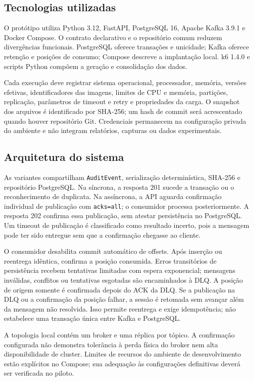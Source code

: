 \subsection{Tecnologias utilizadas}
O protótipo utiliza Python 3.12, FastAPI, PostgreSQL 16, Apache Kafka 3.9.1 e Docker Compose. O contrato declarativo e o repositório comum reduzem divergências funcionais. PostgreSQL oferece transações e unicidade; Kafka oferece retenção e posições de consumo; Compose descreve a implantação local. k6 1.4.0 e scripts Python compõem a geração e consolidação dos dados.

Cada execução deve registrar sistema operacional, processador, memória, versões efetivas, identificadores das imagens, limites de CPU e memória, partições, replicação, parâmetros de timeout e retry e propriedades da carga. O snapshot dos arquivos é identificado por SHA-256; um hash de commit será acrescentado quando houver repositório Git. Credenciais permanecem na configuração privada do ambiente e não integram relatórios, capturas ou dados experimentais.

\subsection{Arquitetura do sistema}
As variantes compartilham \texttt{AuditEvent}, serialização determinística, SHA-256 e repositório PostgreSQL. Na síncrona, a resposta 201 sucede a transação ou o reconhecimento de duplicata. Na assíncrona, a API aguarda confirmação individual de publicação com \texttt{acks=all}; o consumidor processa posteriormente. A resposta 202 confirma essa publicação, sem atestar persistência no PostgreSQL. Um timeout de publicação é classificado como resultado incerto, pois a mensagem pode ter sido entregue sem que a confirmação chegasse ao cliente.

O consumidor desabilita commit automático de offsets. Após inserção ou reentrega idêntica, confirma a posição consumida. Erros transitórios de persistência recebem tentativas limitadas com espera exponencial; mensagens inválidas, conflitos ou tentativas esgotadas são encaminhados à DLQ. A posição de origem somente é confirmada depois do ACK da DLQ. Se a publicação na DLQ ou a confirmação da posição falhar, a sessão é retomada sem avançar além da mensagem não resolvida. Isso permite reentrega e exige idempotência; não estabelece uma transação única entre Kafka e PostgreSQL.

A topologia local contém um broker e uma réplica por tópico. A confirmação configurada não demonstra tolerância à perda física do broker nem alta disponibilidade de cluster. Limites de recursos do ambiente de desenvolvimento estão explícitos no Compose; sua adequação às configurações definitivas deverá ser verificada no piloto.


